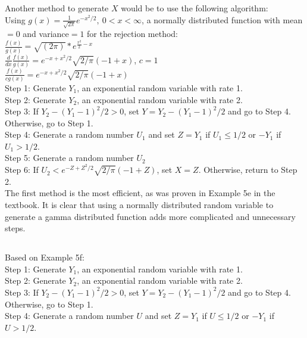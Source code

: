 \documentclass{article}
\begin{document}
Another method to generate $X$ would be to use the following algorithm: \\
Using $g(x) = \frac{1}{\sqrt{2\pi}}e^{-x^2/2},~ 0<x<\infty$, a normally distributed function with mean$=0$ and variance$=1$ for the rejection method:\\
$\frac{f(x)}{g(x)} = \sqrt{(2\pi)}*e^{\frac{x^2}{2}-x}$ \\
$\frac{d}{dx}\frac{f(x)}{g(x)} = e^{-x + x^2/2} \sqrt{2/\pi} (-1 + x)$, $c=1$ \\
$\frac{f(x)}{cg(x)} = e^{-x + x^2/2} \sqrt{2/\pi} (-1 + x)$ \\
Step 1: Generate $Y_1$, an exponential random variable with rate 1. \\
Step 2: Generate $Y_2$, an exponential random variable with rate 2. \\
Step 3: If $Y_2 - (Y_1-1)^2/2 > 0$, set $Y=Y_2-(Y_1-1)^2/2$ and go to Step 4. Otherwise, go to Step 1. \\
Step 4: Generate a random number $U_1$ and set $Z = Y_1$ if $U_1 \leq 1/2$ or $-Y_1$ if $U_1 > 1/2$. \\
Step 5: Generate a random number $U_2$ \\
Step 6: If $U_2 < e^{-Z + Z^2/2} \sqrt{2/\pi} (-1 + Z)$, set $X=Z$. Otherwise, return to Step 2. \\
The first method is the most efficient, as was proven in Example 5e in the textbook. It is clear that using a normally distributed random variable to generate a gamma distributed function adds more complicated and unnecessary steps.
\newpage
\setcounter{subsection}{17}
\subsection{}
Based on Example 5f:\\
Step 1: Generate $Y_1$, an exponential random variable with rate 1. \\
Step 2: Generate $Y_2$, an exponential random variable with rate 2. \\
Step 3: If $Y_2 - (Y_1-1)^2/2 > 0$, set $Y=Y_2-(Y_1-1)^2/2$ and go to Step 4. Otherwise, go to Step 1. \\
Step 4: Generate a random number $U$ and set $Z = Y_1$ if $U \leq 1/2$ or $-Y_1$ if $U > 1/2$. \\
\newpage
\end{document}
